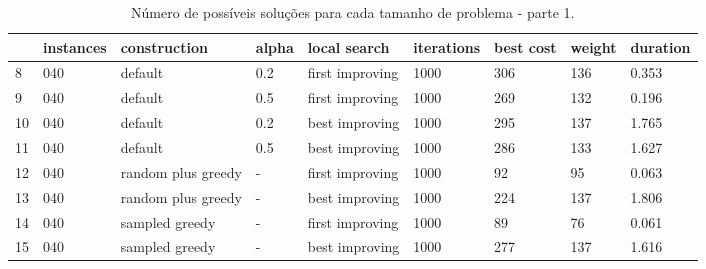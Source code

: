 \begin{landscape}
    \begin{table}
    \centering
    \begin{tabular}{lllllllll}
    \toprule
    {} & instances &        construction & alpha &     local search & iterations & best cost & weight & duration \\
    \midrule
    8  &       040 &             default &   0.2 &  first improving &       1000 &       306 &    136 &    0.353 \\
    9  &       040 &             default &   0.5 &  first improving &       1000 &       269 &    132 &    0.196 \\
    10 &       040 &             default &   0.2 &   best improving &       1000 &       295 &    137 &    1.765 \\
    11 &       040 &             default &   0.5 &   best improving &       1000 &       286 &    133 &    1.627 \\
    12 &       040 &  random plus greedy &     - &  first improving &       1000 &        92 &     95 &    0.063 \\
    13 &       040 &  random plus greedy &     - &   best improving &       1000 &       224 &    137 &    1.806 \\
    14 &       040 &      sampled greedy &     - &  first improving &       1000 &        89 &     76 &    0.061 \\
    15 &       040 &      sampled greedy &     - &   best improving &       1000 &       277 &    137 &    1.616 \\
    \bottomrule
    \end{tabular}
    \caption{Número de possíveis soluções para cada tamanho de problema - parte 1.}
    \label{table:all-data-1}
    \end{table}


\end{landscape}
